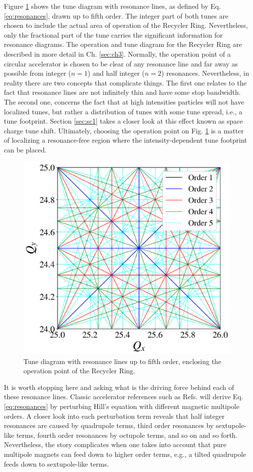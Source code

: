 Figure \ref{fig:tunediagram} shows the tune diagram with resonance lines, as defined by Eq. \ref{eq:resonances}, drawn up to fifth order. The integer part of both tunes are chosen to include the actual area of operation of the Recycler Ring. Nevertheless, only the fractional part of the tune carries the significant information for resonance diagrams. The operation and tune diagram for the Recycler Ring are described in more detail in Ch. \ref{sec:ch3}. Normally, the operation point of a circular accelerator is chosen to be clear of any resonance line and far away as possible from integer ($n=1$) and half integer ($n=2$) resonances. Nevertheless, in reality there are two concepts that complicate things. The first one relates to the fact that resonance lines are not infinitely thin and have some stop bandwidth. The second one, concerns the fact that at high intensities particles will not have localized tunes, but rather a distribution of tunes with some tune spread, i.e., a tune footprint. Section \ref{sec:sc1} takes a closer look at this effect known as space charge tune shift. Ultimately, choosing the operation point on Fig. \ref{fig:tunediagram} is a matter of localizing a resonance-free region where the intensity-dependent tune footprint can be placed.   
\begin{figure}[H]
    \centering
    \includegraphics[width=0.8\columnwidth]{chapter2/tunediagram.png}
    \caption{Tune diagram with resonance lines up to fifth order, enclosing the operation point of the Recycler Ring.}
    \label{fig:tunediagram}
 \end{figure}
It is worth stopping here and asking what is the driving force behind each of these resonance lines. Classic accelerator references such as Refs. \cite{wolski,Wiedemann2015,sylee} will derive Eq. \ref{eq:resonances} by perturbing Hill's equation with different magnetic multipole orders. A closer look into each perturbation term reveals that half integer resonances are caused by quadrupole terms, third order resonances by sextupole-like terms, fourth order resonances by octupole terms, and so on and so forth. Nevertheless, the story complicates when one takes into account that pure multipole magnets can feed down to higher order terms, e.g., a tilted quadrupole feeds down to sextupole-like terms.        

